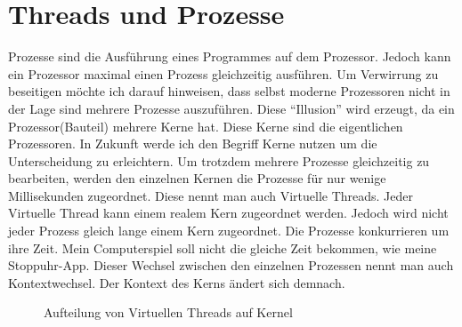 \section{Threads und Prozesse}
Prozesse sind die Ausführung eines Programmes auf dem Prozessor. Jedoch kann ein Prozessor maximal einen Prozess gleichzeitig ausführen. Um Verwirrung zu beseitigen möchte ich darauf hinweisen, dass selbst moderne Prozessoren nicht in der Lage sind mehrere Prozesse auszuführen. Diese ``Illusion'' wird erzeugt, da ein Prozessor(Bauteil) mehrere Kerne hat. Diese Kerne sind die eigentlichen Prozessoren. In Zukunft werde ich den Begriff Kerne nutzen um die Unterscheidung zu erleichtern. Um trotzdem mehrere Prozesse gleichzeitig zu bearbeiten, werden den einzelnen Kernen die Prozesse für nur wenige Millisekunden zugeordnet. Diese nennt man auch Virtuelle Threads. Jeder Virtuelle Thread kann einem realem Kern zugeordnet werden. Jedoch wird nicht jeder Prozess gleich lange einem Kern zugeordnet. Die Prozesse konkurrieren um ihre Zeit. Mein Computerspiel soll nicht die gleiche Zeit bekommen, wie meine Stoppuhr-App. Dieser Wechsel zwischen den einzelnen Prozessen nennt man auch Kontextwechsel. Der Kontext des Kerns ändert sich demnach.

\begin{figure}[h]
    \centering
    \caption{Aufteilung von Virtuellen Threads auf Kernel}
\end{figure}

